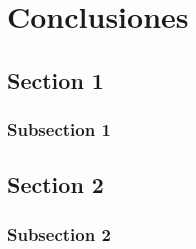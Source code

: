 \chapter{Conclusiones}
\label{ch5}

\section{Section 1}
    \subsection{Subsection 1}

\section{Section 2}
    \subsection{Subsection 2}
